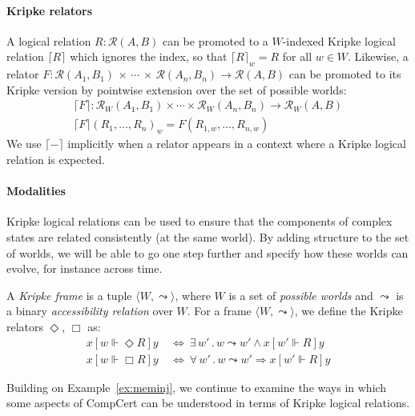 \documentclass[sigplan,10pt,review,anonymous]{acmart}
\newcommand{\ifr}[1]{\mathrel{[{#1}]}}
\begin{document}
\paragraph{Kripke relators}

A logical relation $R : \mathcal{R}(A, B)$
can be promoted to a $W$-indexed Kripke logical relation $\lceil R \rceil$
which ignores the index, so that $\lceil R \rceil_w = R$ for all $w \in W$.
Likewise,
a relator
  $F : \mathcal{R}(A_1, B_1) \,\times\,\cdots\,\times\,\mathcal{R}(A_n, B_n) \rightarrow \mathcal{R}(A, B)$
can be promoted to its Kripke version
by pointwise extension over the set of possible worlds:
\begin{gather*}
  \lceil F \rceil : \mathcal{R}_W(A_1, B_1) \times \cdots \times \mathcal{R}_W(A_n, B_n) \rightarrow \mathcal{R}_W(A, B) \\
  \lceil F \rceil (R_1, \ldots, R_n)_w = F(R_{1,w}, \ldots, R_{n,w})
\end{gather*}
We use $\lceil - \rceil$ implicitly
when a relator appears in a context where
a Kripke logical relation is expected.

\paragraph{Modalities}

Kripke logical relations
can be used to ensure that the components of complex states
are related consistently (at the same world).
By adding structure to the set of worlds,
we will be able to go one step further and
specify how these worlds can evolve,
for instance across time.

\begin{definition} %
A \emph{Kripke frame} is a tuple
$\langle W, {\leadsto} \rangle$, where
$W$ is a set of \emph{possible worlds} and
$\leadsto$ is a
binary \emph{accessibility relation} over $W$.
For a frame
$\langle W, \leadsto \rangle$,
we define the Kripke relators $\Diamond$, $\Box$ as:
\begin{align*}
  x \ifr{w \Vdash \Diamond R} y & \: \Leftrightarrow \:
    \exists \, w' \,.\, w \leadsto w' \wedge
      x \ifr{w' \Vdash R} y \\
  x \ifr{w \Vdash \Box R} y & \: \Leftrightarrow \:
    \forall \, w' \,.\, w \leadsto w' \Rightarrow
      x \ifr{w' \Vdash R} y
\end{align*}
\end{definition}

Building on Example~\ref{ex:meminj},
we continue to examine the ways in which
some aspects of CompCert can be understood
in terms of Kripke logical relations.
\end{document}
